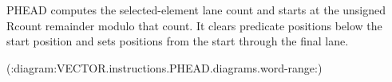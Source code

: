 PHEAD computes the selected-element lane count and starts at the unsigned
Rcount remainder modulo that count.  It clears predicate positions below the
start position and sets positions from the start through the final lane.

(:diagram:VECTOR.instructions.PHEAD.diagrams.word-range:)
